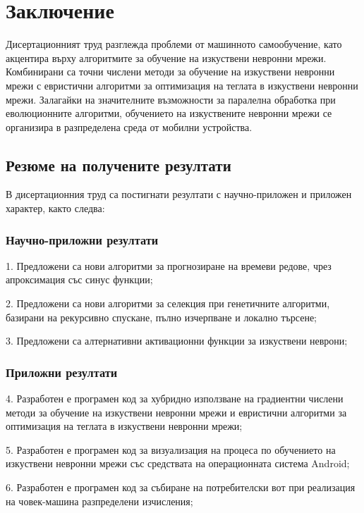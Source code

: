﻿
\chapter*{Заключение}

Дисертационният труд разглежда проблеми от машинното самообучение, като акцентира върху алгоритмите за обучение на изкуствени невронни мрежи. Комбинирани са точни числени методи за обучение на изкуствени невронни мрежи с евристични алгоритми за оптимизация на теглата в изкуствени невронни мрежи. Залагайки на значителните възможности за паралелна обработка при еволюционните алгоритми, обучението на изкуствените невронни мрежи се организира в разпределена среда от мобилни устройства.

\section*{Резюме на получените резултати}

В дисертационния труд са постигнати резултати с научно-приложен и приложен характер, както следва:

\subsection*{Научно-приложни резултати}

\begin{description}
\item 1. Предложени са нови алгоритми за прогнозиране на времеви редове, чрез апроксимация със синус функции;
\item 2. Предложени са нови алгоритми за селекция при генетичните алгоритми, базирани на рекурсивно спускане, пълно изчерпване и локално търсене;
\item 3. Предложени са алтернативни активационни функции за изкуствени неврони;
\end{description}

\subsection*{Приложни резултати}

\begin{description}
\item 4. Разработен е програмен код за хубридно използване на градиентни числени методи за обучение на изкуствени невронни мрежи и евристични алгоритми за оптимизация на теглата в изкуствени невронни мрежи;
\item 5. Разработен е програмен код за визуализация на процеса по обучението на изкуствени невронни мрежи със средствата на операционната система Android;
\item 6. Разработен е програмен код за събиране на потребителски вот при реализация на човек-машина разпределени изчисления;
\end{description}

